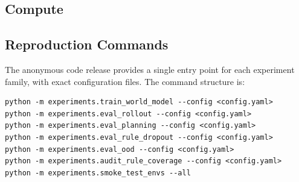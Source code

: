 \documentclass{article}
\theoremstyle{plain}
\theoremstyle{definition}
\theoremstyle{remark}
\begin{document}
\subsection{Compute}
\label{app:compute}

\begin{table}[h]
  \centering
  \footnotesize
  \caption{Compute report used for the NeurIPS checklist.}
  \label{tab:compute_template}
\end{table}

\subsection{Reproduction Commands}
\label{app:commands}

The anonymous code release provides a single entry point for each experiment family, with exact configuration files. The command structure is:
\begin{verbatim}
python -m experiments.train_world_model --config <config.yaml>
python -m experiments.eval_rollout --config <config.yaml>
python -m experiments.eval_planning --config <config.yaml>
python -m experiments.eval_rule_dropout --config <config.yaml>
python -m experiments.eval_ood --config <config.yaml>
python -m experiments.audit_rule_coverage --config <config.yaml>
python -m experiments.smoke_test_envs --all
\end{verbatim}
\end{document}
